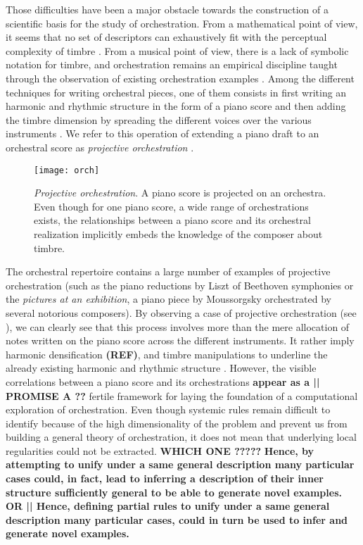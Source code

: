 \documentclass[letterpaper]{article}
\begin{document}
Those difficulties have been a major obstacle towards the construction of a scientific basis for the study of orchestration. From a mathematical point of view, it seems that no set of descriptors can exhaustively fit with the perceptual complexity of timbre \cite{peeters2011timbre}. From a musical point of view, there is a lack of symbolic notation for timbre, and orchestration remains an empirical discipline taught through the observation of existing orchestration examples \cite{piston-orch}. Among the different techniques for writing orchestral pieces, one of them  consists in first writing an harmonic and rhythmic structure in the form of a piano score and then adding the timbre dimension by spreading the different voices over the various instruments \cite{piston-orch}. We refer to this operation of extending a piano draft to an orchestral score as \textit{projective orchestration} \cite{eslingthesis}.

\begin{figure}
\centering
\texttt{[image: orch]}
\caption{\textit{Projective orchestration}. A piano score is projected on an orchestra. Even though for one piano score, a wide range of orchestrations exists, the relationships between a piano score and its orchestral realization implicitly embeds the knowledge of the composer about timbre.}
\label{fig:orch}
\end{figure}

The orchestral repertoire contains a large number of examples of projective orchestration (such as the piano reductions by Liszt of Beethoven symphonies or the \textit{pictures at an exhibition}, a piano piece by Moussorgsky orchestrated by several notorious composers). By observing a case of projective orchestration (see ), we can clearly see that this process involves more than the mere allocation of notes written on the piano score across the different instruments. It rather imply harmonic densification \textbf{(REF)}, and timbre manipulations to underline the already existing harmonic and rhythmic structure \cite{mcadams2013timbre}. However, the visible correlations between a piano score and its orchestrations \textbf{appear as a || PROMISE A ??} fertile framework for laying the foundation of a computational exploration of orchestration. Even though systemic rules remain difficult to identify because of the high dimensionality of the problem and prevent us from building a general theory of orchestration, it does not mean that underlying local regularities could not be extracted.
\textbf{WHICH ONE ?????}
\textbf{Hence,  by attempting to unify under a same general description many particular cases could, in fact, lead to inferring a description of their inner structure sufficiently general to be able to generate novel examples.}
 \textbf{OR || Hence, defining partial rules to unify under a same general description many particular cases, could in turn be used to infer and generate novel examples.}
\end{document}
